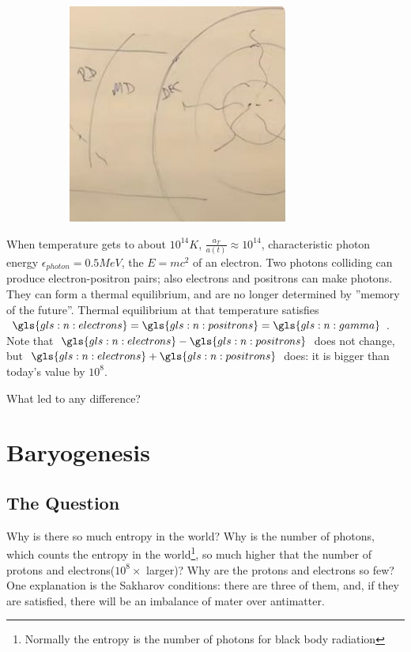 \documentclass[]{article}
\begin{document}
\begin{figure}[H]
\begin{subfigure}[t]{0.45\textwidth}
		\includegraphics[width=\textwidth]{cosmo-7-universe-2}
	\end{subfigure}
\end{figure}

When temperature gets to about $10^{14}K$, $\frac{a_T}{a(t)}\approx 10^{14}$, characteristic photon energy $\epsilon_{photon}=0.5MeV$,  the $E=mc^2$ of an electron. Two photons colliding can produce electron-positron pairs; also electrons and positrons can make photons. They can form a thermal equilibrium, and are no longer determined by ''memory of the future''. Thermal equilibrium at that temperature satisfies $\gls{gls:n:electrons}=\gls{gls:n:positrons}=\gls{gls:n:gamma}$. Note that  $\gls{gls:n:electrons}-\gls{gls:n:positrons}$ does not change, but $\gls{gls:n:electrons}+\gls{gls:n:positrons}$ does: it is bigger than today's value by $10^8$.

What led to any difference?



\section{Baryogenesis}

\subsection{The Question}
Why is there so much entropy in the world? Why is the number of photons, which counts the entropy in the world\footnote{Normally the entropy is the number of photons for black body radiation}, so much higher that the number of protons and electrons($10^8\times$ larger)? Why are the protons and electrons so few? One  explanation is the Sakharov conditions: there are three of them, and, if they are satisfied, there will be an imbalance of mater over antimatter.
\end{document}
